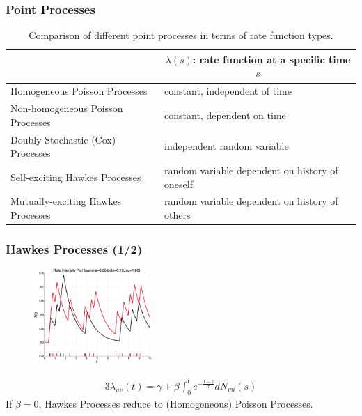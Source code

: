 \documentclass{beamer}
\begin{document}
\begin{frame}
\frametitle{Point Processes}
\fontsize{6pt}{12}\selectfont
\begin{table}[ht]
\centering
    \begin{tabular}{| l | l |} \hline
    & \multicolumn{1}{|c|}{$\lambda(s)$: rate function at a specific time $s$}\\ \hline
    Homogeneous Poisson Processes & constant, independent of time \\ \hline
    Non-homogeneous Poisson Processes & constant, dependent on time \\ \hline
    Doubly Stochastic (Cox) Processes & independent random variable \\ \hline
    Self-exciting Hawkes Processes & random variable dependent on history of oneself\\ \hline
    Mutually-exciting Hawkes Processes & random variable dependent on history of others \\
    \hline    
    \end{tabular}
    \caption{Comparison of different point processes in terms of rate function types.}
\end{table}
\end{frame}


\begin{frame}
\frametitle{Hawkes Processes (1/2)}
\begin{figure}[ht]
  \centering
  \includegraphics[width=0.4\textwidth]{figures/mutually-exciting}  
\end{figure}

\begin{alignat}{3}
  \lambda_{uv}(t) = \gamma + \beta \int_0^t e^{-\frac{t-s}{\tau}} dN_{vu}(s)  
\end{alignat}
If $\beta = 0$, Hawkes Processes reduce to (Homogeneous) Poisson Processes.
\end{frame}
\end{document}
